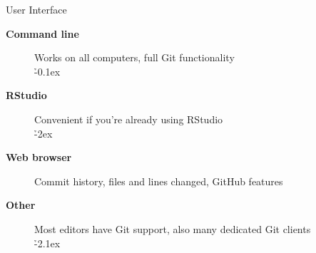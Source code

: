 \documentclass[aspectratio=169]{beamer}
\begin{document}



\begin{frame}{User Interface}\small
  \begin{description}
    \item[\bf Command line] Works on all computers, full Git
    functionality\\[0.8ex]
    \h{-0.1ex}\\[5ex]
    \item[\bf RStudio] Convenient if you're already using RStudio\\[0.8ex]
    \h{-2ex}\\[5ex]
    \item[\bf Web browser] Commit history, files and lines changed, GitHub
    features\\[5ex]
    \item[\bf Other] Most editors have Git support, also many dedicated Git
    clients\\[0.8ex]
    \h{-2.1ex}
  \end{description}
\end{frame}

\end{document}
